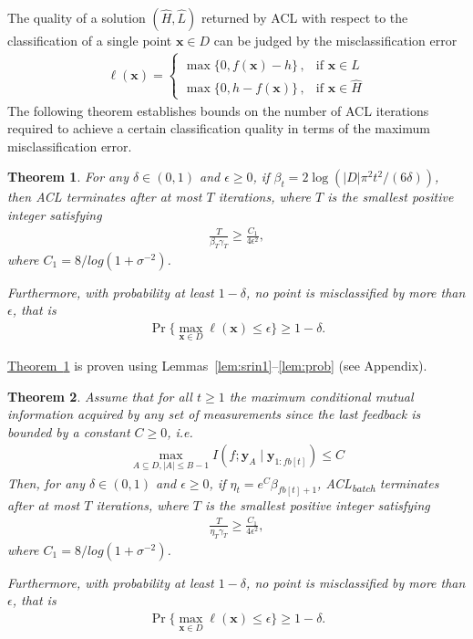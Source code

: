 \documentclass{article}
\def\*#1{\bm{#1}}
\newcommand{\theoremref}[1]{\hyperref[#1]{\mbox{Theorem~\ref*{#1}}}}
\newcommand{\twopartdef}[4]
{
	\left\{
		\begin{array}{ll}
			#1\,,& \mbox{if } #2 \\
			#3\,,& \mbox{if } #4
		\end{array}
	\right.
}
\newtheorem{theorem}{Theorem}
\newcommand{\acl}{\textsf{ACL}\xspace}
\newcommand{\bacl}{\textsf{ACL\textsubscript{batch}}\xspace}
\begin{document}
The quality of a solution $(\hat{H}, \hat{L})$ returned by \acl with
respect to the classification of a single point $\*x \in D$ can be
judged by the misclassification error
\begin{align*}
\ell(\*x) = \twopartdef{\max\{0, f(\*x) - h\}}{\*x\in \hat{L}}{\max\{0, h - f(\*x)\}}{\*x\in \hat{H}}
\end{align*}
The following theorem establishes bounds on the number of \acl iterations
required to achieve a certain classification quality in terms of the
maximum misclassification error.

\begin{theorem}
\label{thm:acl}
For any $\delta \in (0, 1)$ and $\epsilon \geq 0$,
if $\beta_t = 2\log(|D|\pi^2 t^2/(6\delta))$, then \acl terminates after
at most $T$ iterations, where $T$ is the smallest positive integer
satisfying
\begin{align*}
\frac{T}{\beta_T \gamma_T} \geq \frac{C_1}{4\epsilon^2},
\end{align*}
where $C_1 = 8/log(1 + \sigma^{-2})$.

Furthermore, with probability at least $1-\delta$, no point is
misclassified by more than $\epsilon$, that is
\begin{align*}
\Pr\{\max_{\*x\in D}\ell(\*x) \leq \epsilon\} \geq 1 - \delta.
\end{align*}
\end{theorem}

\theoremref{thm:acl} is proven using
Lemmas~\ref{lem:srin1}--\ref{lem:prob} (see Appendix).

\begin{theorem}
\label{thm:bacl}
Assume that for all $t \geq 1$ the maximum conditional mutual information
acquired by any set of measurements since the last feedback is bounded
by a constant $C \geq 0$, i.e.
\begin{align*}
\max_{A\subseteq D, |A|\leq B-1} I(f; \*y_A \mid \*y_{1:fb[t]}) \leq C
\end{align*}
Then, for any $\delta \in (0, 1)$ and $\epsilon \geq 0$,
if $\eta_t = e^C\beta_{fb[t]+1}$, \bacl terminates after
at most $T$ iterations, where $T$ is the smallest positive integer
satisfying
\begin{align*}
\frac{T}{\eta_T \gamma_T} \geq \frac{C_1}{4\epsilon^2},
\end{align*}
where $C_1 = 8/log(1 + \sigma^{-2})$.

Furthermore, with probability at least $1-\delta$, no point is
misclassified by more than $\epsilon$, that is
\begin{align*}
\Pr\{\max_{\*x\in D}\ell(\*x) \leq \epsilon\} \geq 1 - \delta.
\end{align*}
\end{theorem}
\end{document}
